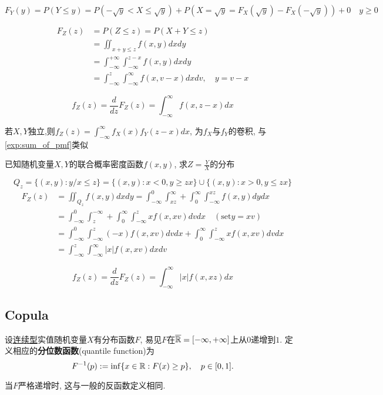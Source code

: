 \begin{solution}
    \[ F_Y(y)=P(Y\le y)=P(-\sqrt{y}<X\le \sqrt{y})+P(X=\sqrt{y}=F_X(\sqrt{y})-F_X(-\sqrt{y}))+0 \quad y\ge 0\]

    \begin{align*}
        F_Z(z) & =P(Z\le z)=P(X+Y\le z)                                               \\
               & =\iint_{x+y\leq z}f(x,y)dxdy                                         \\
               & =\int_{-\infty}^{+\infty}\int_{-\infty}^{z-x}f(x,y)dxdy              \\
               & =\int_{-\infty}^{z}\int_{-\infty}^{\infty}f(x,v-x)dxdv, \quad y= v-x
    \end{align*}

    \[ f_Z(z)=\frac{d}{dz}F_Z(z)=\int_{-\infty}^{\infty}f(x,z-x)dx \]

    若$X,Y$独立,则$f_Z(z)=\int_{-\infty}^{\infty}f_X(x)f_Y(z-x)dx$, 为$f_X$与$f_Y$的卷积, 与\ref{exp:sum_of_pmf}类似
\end{solution}

\begin{example}
    已知随机变量$X,Y$的联合概率密度函数$f(x,y)$, 求$Z=\frac{Y}{X}$的分布
\end{example}

\begin{solution}
    \[ Q_{z}=\{(x, y): y / x \leq z\}=\{(x, y): x<0, y \geq z x\} \cup\{(x, y): x>0, y \leq z x\} \]
    \begin{align*}
        F_{Z}(z) & =\iint_{Q_{z}} f(x, y) d x d y=\int_{-\infty}^{0} \int_{x z}^{\infty}+\int_{0}^{\infty} \int_{-\infty}^{x z} f(x, y) d y d x \\
                 & =\int_{-\infty}^{0} \int_{z}^{-\infty}+\int_{0}^{\infty} \int_{-\infty}^{z} x f(x, x v) d v d x \quad(\text{set} y=x v)      \\
                 & =\int_{-\infty}^{0} \int_{-\infty}^{z}(-x) f(x, x v) d v d x+\int_{0}^{\infty} \int_{-\infty}^{z} x f(x, xv) dvdx            \\
                 & =\int_{-\infty}^{z} \int_{-\infty}^{\infty}|x| f(x, xv) dxdv
    \end{align*}

    \[ f_Z(z)=\frac{d}{dz}F_Z(z)=\int_{-\infty}^{\infty}|x|f(x,xz)dx \]
\end{solution}

\subsection{Copula}\label{subsec:Copula}
\begin{definition}
    设\underline{连续型}实值随机变量$X$有分布函数$F$, 易见$F$在$\overline{\mathbb{R}}=[-\infty,+\infty]$上从$0$递增到$1$. 定义相应的\textbf{分位数函数}(quantile function)为
    \[ F^{-1}(p) := \inf\{x\in\mathbb{R}:F(x)\ge p\}, \quad p \in [0,1]. \]
\end{definition}
\begin{remark}
    当$F$严格递增时, 这与一般的反函数定义相同.
\end{remark}

